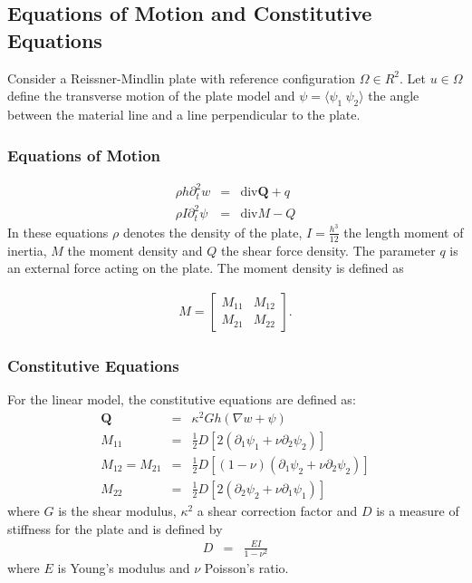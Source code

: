 \documentclass[../../main.tex]{subfiles}
\begin{document}
	\subsection{Equations of Motion and Constitutive Equations}\label{ssec:P_Model:EquationsOfMotion+ConstitutiveEquation}
	Consider a Reissner-Mindlin plate with reference configuration $\Omega \in R^2$. Let $u \in \Omega$ define the transverse motion of the plate model and $\psi = \langle \psi_1 \ \psi_2 \rangle$ the angle between the material line and a line perpendicular to the plate.
	
	\subsubsection*{Equations of Motion}\label{sssec:P_Model:EquationsOfMotion}
	\begin{eqnarray}
		\rho h \partial_t^2 w & = & \textrm{div} \mathbf{Q} + q \label{eq:P_Model:EM1}\\
		\rho I \partial_t^2 {\psi} & = & \textrm{div} M - Q \label{P2}\label{eq:P_Model:EM1}
	\end{eqnarray} \label{sym:bfQ}
	In these equations $\rho$ denotes the density of the plate, $\displaystyle I = \frac{h^3}{12}$ the length moment of inertia, $M$ the moment density and $Q$ the shear force density. The parameter $q$ is an external force acting on the plate. The moment density is defined as
	
	\begin{eqnarray*}
		M = 
		\begin{bmatrix}
			M_{11} & M_{12}\\
			M_{21} & M_{22}
		\end{bmatrix}.
	\end{eqnarray*}
	
	\subsubsection*{Constitutive Equations}\label{sssec:P_Model:ConstitutiveEquation}
	For the linear model, the constitutive equations are defined as:
	\begin{eqnarray}
		\mathbf{Q} & = & \kappa^2 G h(\nabla w + \psi) \label{eq:P_Model:CE1} \\
		M_{11} & = & \frac{1}{2} D \left[2(\partial_1 \psi_1 + \nu \partial_2 \psi_2)\right]  \label{eq:P_Model:CE2}\\
		M_{12} =  M_{21} & = & \frac{1}{2} D \left[(1-\nu)(\partial_1 \psi_2 + \nu \partial_2 \psi_2)\right] \label{eq:P_Model:CE3} \\
		M_{22} & = & \frac{1}{2} D \left[2(\partial_2 \psi_2 + \nu \partial_1 \psi_1)\right] \label{eq:P_Model:CE4}
	\end{eqnarray}
	where $G$ is the shear modulus, $\kappa^2$ a shear correction factor and $D$ is a measure of stiffness for the plate and is defined by
	\begin{eqnarray*}
		D & = & \frac{EI}{1-\nu^2}
	\end{eqnarray*}
	where $E$ is Young's modulus and $\nu$ Poisson's ratio.\\
	
\end{document}
